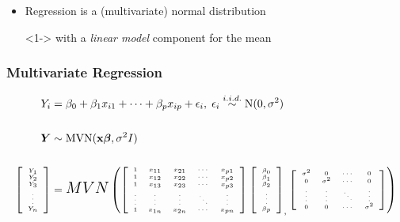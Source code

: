 \documentclass[xcolor={dvipsnames}]{beamer}
\begin{document}
{\begin{itemize}
\item[]
\item<1-> Regression is a (multivariate) normal distribution 
\item[]<1-> with a \emph{linear model} component for the mean 
\item[]
\item[]

\end{itemize}

}



\frame
{
 \frametitle{Multivariate Regression}
 
 
\begin{align*}
Y_i = {}& \beta_0+\beta_1x_{i1} + \cdots + \beta_px_{ip} + \epsilon_i,  \;  \epsilon_i \overset{\tiny i.i.d.}{\sim}  \textrm{N}(0,\sigma^2)\\{}\\
 {\boldsymbol Y} \sim {} &  \textrm{MVN}(\textbf{x}{\boldsymbol\beta},\sigma^2I)\\{}\\
\tiny
\left[\begin{array}{c} Y_1 \\ Y_2 \\ Y_3 \\ \vdots\\ Y_n \end{array} \right] 
= {} & \tiny{\Large \text{$MVN$}} \left(
\left[\begin{array}{ccccc} 1 & x_{11} & x_{21} &\cdots & x_{p1}\\
1 & x_{12} & x_{22} & \cdots & x_{p2}\\ 
1 & x_{13} & x_{23} & \cdots & x_{p3}\\ 
\vdots & \vdots & \vdots & \ddots & \vdots\\ 
1 & x_{1n} & x_{2n} & \cdots & x_{pn}
 \end{array} \right]  
 \left[\begin{array}{c}\beta_0 \\ \beta_1 \\ \beta_2 \\ \vdots\\ \beta_p \end{array} \right]_,
 \left[\begin{array}{cccc}\sigma^2&0 & \cdots & 0\\ 
0 &\sigma^2&  \cdots & 0\\
\vdots &\vdots&  \ddots & \vdots\\
0 & 0 &   \cdots & \sigma^2\\ \end{array}\right]\right)\end{align*}

}
\end{document}
